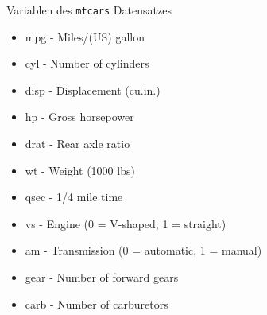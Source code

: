 \documentclass[
  ignorenonframetext,
]{beamer}
\providecommand{\tightlist}{%
  \setlength{\itemsep}{0pt}\setlength{\parskip}{0pt}}
\begin{document}
\begin{frame}{Variablen des \texttt{mtcars} Datensatzes}
\protect\hypertarget{variablen-des-mtcars-datensatzes}{}

\begin{itemize}
\tightlist
\item
  mpg - Miles/(US) gallon
\item
  cyl - Number of cylinders
\item
  disp - Displacement (cu.in.)
\item
  hp - Gross horsepower
\item
  drat - Rear axle ratio
\item
  wt - Weight (1000 lbs)
\item
  qsec - 1/4 mile time
\item
  vs - Engine (0 = V-shaped, 1 = straight)
\item
  am - Transmission (0 = automatic, 1 = manual)
\item
  gear - Number of forward gears
\item
  carb - Number of carburetors
\end{itemize}

\end{frame}
\end{document}
